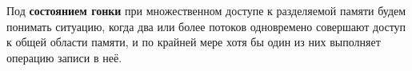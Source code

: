 \Introduction

Под \textbf{состоянием гонки} при множественном доступе к разделяемой памяти будем понимать ситуацию, когда два или более потоков одновремено совершают доступ к общей области памяти, и по крайней мере хотя бы один из них выполняет операцию записи в неё. 





